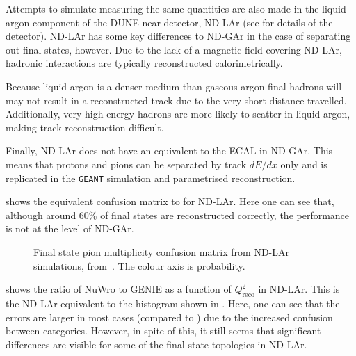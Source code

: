 Attempts to simulate measuring the same quantities are also made in the liquid argon component of the DUNE near detector, ND-LAr (see  for details of the detector).
ND-LAr has some key differences to ND-GAr in the case of separating out final states, however. 
Due to the lack of a magnetic field covering ND-LAr, hadronic interactions are typically reconstructed calorimetrically.

Because liquid argon is a denser medium than gaseous argon final hadrons will may not result in a reconstructed track due to the very short distance travelled.
Additionally, very high energy hadrons are more likely to scatter in liquid argon, making track reconstruction difficult.

Finally, ND-LAr does not have an equivalent to the ECAL in ND-GAr.
This means that protons and pions can be separated by track $dE/dx$ only and is replicated in the \texttt{GEANT} simulation and parametrised reconstruction.

 shows the equivalent confusion matrix to  for ND-LAr.
Here one can see that, although around 60\% of final states are reconstructed correctly, the performance is not at the level of ND-GAr.

\begin{figure}[h]
	\begin{adjustbox}{max totalsize=.6\linewidth, center}
		
	\end{adjustbox}
	\caption[Final state pion multiplicity confusion matrix from ND-LAr simulations]{Final state pion multiplicity confusion matrix from ND-LAr simulations, from~\cite{ndCdr}. The colour axis is probability.}
	\label{fig:larConfusMat}
\end{figure}

 shows the ratio of NuWro to GENIE as a function of $Q^{2}_{\textrm{reco}}$ in ND-LAr.
This is the ND-LAr equivalent to the histogram shown in . 
Here, one can see that the errors are larger in most cases (compared to ) due to the increased confusion between categories.
However, in spite of this, it still seems that significant differences are visible for some of the final state topologies in ND-LAr.

